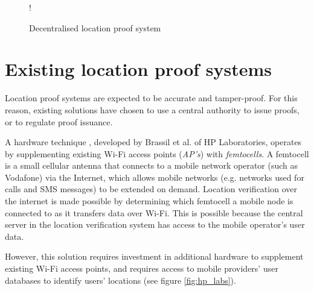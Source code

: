 \begin{figure}[H]
\begin{center}
 {!} {}
\end{center}
\caption{Decentralised location proof system}
\label{fig:decentralised_location}
\end{figure}

\section{Existing location proof systems} \label{ssec:proof_systems}
Location proof systems are expected to be accurate and tamper-proof. For this reason, existing solutions \cite{brassil, luo, khan} have chosen to use a central authority to issue proofs, or to regulate proof issuance.

A hardware technique \cite{brassil}, developed by Brassil et al. of HP Laboratories, operates by supplementing existing Wi-Fi access points (\textit{AP's}) with \textit{femtocells}. A femtocell \cite{femtocell} is a small cellular antenna that connects to a mobile network operator (such as Vodafone) via the Internet, which allows mobile networks (e.g. networks used for calls and SMS messages) to be extended on demand. Location verification over the internet is made possible by determining which femtocell a mobile node is connected to as it transfers data over Wi-Fi. This is possible because the central server in the location verification system has access to the mobile operator's user data.

However, this solution requires investment in additional hardware to supplement existing Wi-Fi access points, and requires access to mobile providers' user databases to identify users' locations (see figure \ref{fig:hp_labs}).

